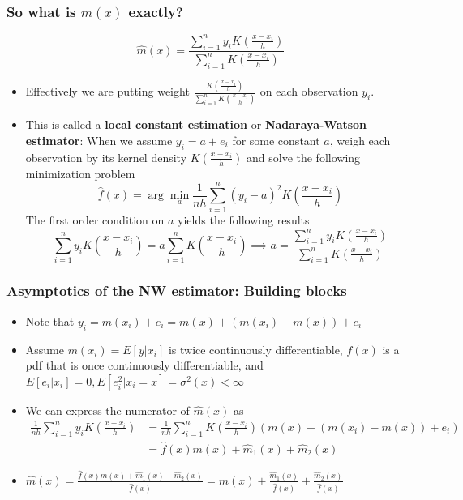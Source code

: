 \documentclass[aspectratio=169]{beamer}
\begin{document}
\begin{frame}
\frametitle{So what is $\hat{m}(x)$ exactly?}
 \[
\hat{m}(x)= \frac{\sum_{i=1}^n y_iK\left(\frac{x-x_i}{h}\right)}{\sum_{i=1}^n K\left(\frac{x-x_i}{h}\right)}
 \]
\begin{itemize}
\item  Effectively we are putting weight $\frac{K\left(\frac{x-x_i}{h}\right)}{\sum_{i=1}^nK\left(\frac{x-x_i}{h}\right)}$ on each observation $y_i$. 
\item This is called a \textbf{local constant estimation} or \textbf{Nadaraya-Watson estimator}: When we assume $y_i = a+e_i$ for some constant $a$, weigh each observation by its kernel density $K\left(\frac{x-x_i}{h}\right)$ and solve the following minimization problem
 \[
 \hat{f}(x)=\arg\min_a\frac{1}{nh}\sum_{i=1}^n(y_i-a)^2K\left(\frac{x-x_i}{h}\right)
 \]
 The first order condition on $a$ yields the following results
 \[
 \sum_{i=1}^ny_iK\left(\frac{x-x_i}{h}\right)=a\sum_{i=1}^nK\left(\frac{x-x_i}{h}\right) \implies a= \frac{\sum_{i=1}^n y_iK\left(\frac{x-x_i}{h}\right)}{\sum_{i=1}^n K\left(\frac{x-x_i}{h}\right)}
 \]
\end{itemize}
\end{frame}

\begin{frame}
\frametitle{Asymptotics of the NW estimator: Building blocks}
 \begin{itemize}
 \item Note that  $y_i = m(x_i)+e_i = m(x) + (m(x_i)-m(x))+e_i$
\item Assume $m(x_i)=E[y|x_i]$ is twice continuously differentiable, $f(x)$ is a pdf that is once continuously differentiable, and $E[e_i|x_i]=0, E[e_i^2|x_i=x]=\sigma^2(x)<\infty$
\item  We can express the numerator of $\hat{m}(x)$ as 
\[\begin{aligned}
\frac{1}{nh}\sum_{i=1}^n y_iK\left(\frac{x-x_i}{h}\right) &=\frac{1}{nh}\sum_{i=1}^n K\left(\frac{x-x_i}{h}\right) (m(x) + (m(x_i)-m(x) )+ e_i)\\ 
&=\hat{f}(x)m(x) + \hat{m}_1(x)+\hat{m}_2(x)
\end{aligned}\]
\item $\hat{m}(x)=\frac{\hat{f}(x)m(x) + \hat{m}_1(x)+\hat{m}_2(x)}{\hat f(x)}= m(x)+\frac{\hat{m}_1(x)}{\hat{f}(x)}+\frac{\hat{m}_2(x)}{\hat{f}(x)}$
\end{itemize}
\end{frame}
\end{document}
